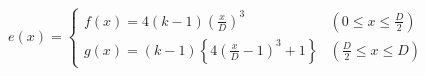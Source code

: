 \documentclass[
  11pt,
  border=2,
  convert={
    density=100 -alpha remove,
    outext=.png
  },
]{standalone}
\begin{document}
$
  e(x) = \begin{cases}
    \displaystyle f(x) = 4(k-1)\left(\frac{x}{D}\right)^{3}
      & \left(0 \leq x \leq \frac{D}{2}\right)
    \\
    \displaystyle g(x) = (k-1)\left\{4\left(\frac{x}{D} - 1\right)^{3} + 1\right\}
      & \left(\frac{D}{2} \leq x \leq D\right)
  \end{cases}
$
\end{document}

